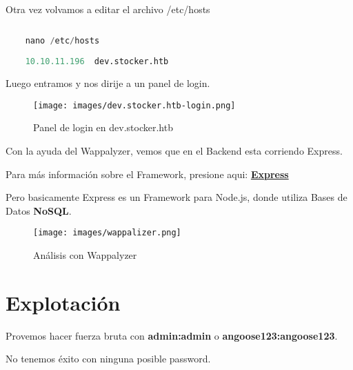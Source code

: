 \documentclass[a4paper]{article} %
\begin{document}
    Otra vez volvamos a editar el archivo /etc/hosts

    \begin{lstlisting}[language=Python, caption=Modificamos el archivo que hace el redireccionamiento y agregamos la IP de la máquina con el subdominio que obtuvimos con wfuzz]
         
    nano /etc/hosts
    
    10.10.11.196  dev.stocker.htb
    \end{lstlisting}

    \par\vspace{1cm}

    Luego entramos y nos dirije a un panel de login.

    \begin{figure}[h] %
        \centering
        \texttt{[image: images/dev.stocker.htb-login.png]}
        \caption{Panel de login en dev.stocker.htb} %
    \end{figure}\par\vspace{2.5cm}

    Con la ayuda del Wappalyzer, vemos que en el Backend esta corriendo Express.

    Para más información sobre el Framework, presione aqui: \href{https://kinsta.com/es/base-de-conocimiento/que-es-express/#:~:text=Cerrar-,Express.,desarrollar%20aplicaciones%20backend%20con%20Node.}{\textbf{\color{orange}Express}}

    Pero basicamente Express es un Framework para Node.js, donde utiliza Bases de Datos \textbf{NoSQL}.

    \begin{figure}[h] %
        \centering
        \texttt{[image: images/wappalizer.png]}
        \caption{Análisis con Wappalyzer} %
    \end{figure}\par\vspace{5cm}

\section{Explotación}
    Provemos hacer fuerza bruta con \textbf{admin:admin} o \textbf{angoose123:angoose123}.\par
    No tenemos éxito con ninguna posible password.
    
\end{document}
